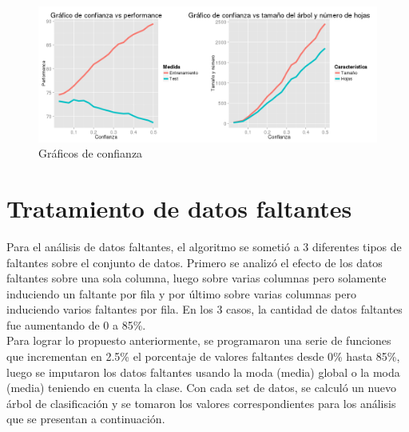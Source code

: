 \documentclass[]{article}
\begin{document}
	\begin{figure}[H]
		\includegraphics[scale = 0.38]{1_3_Conf_Perf_Num}
		\caption[Confianza vs ajuste]{Gráficos de confianza}
		\label{1.P1Conf}
	\end{figure}



%
%






\section{Tratamiento de datos faltantes}
Para el análisis de datos faltantes, el algoritmo se sometió a 3 diferentes tipos de faltantes sobre el conjunto de datos. Primero se analizó el efecto de los datos faltantes sobre una sola columna, luego sobre varias columnas pero solamente induciendo un faltante por fila y por último sobre varias columnas pero induciendo varios faltantes por fila. En los 3 casos, la cantidad de datos faltantes fue aumentando de 0 a 85\%.\\
Para lograr lo propuesto anteriormente, se programaron una serie de funciones que incrementan en 2.5\% el porcentaje de valores faltantes desde 0\% hasta 85\%, luego se imputaron los datos faltantes usando la moda (media) global o la moda (media) teniendo en cuenta la clase. Con cada set de datos, se calculó un nuevo árbol de clasificación y se tomaron los valores correspondientes para los análisis que se presentan a continuación.
\end{document}
